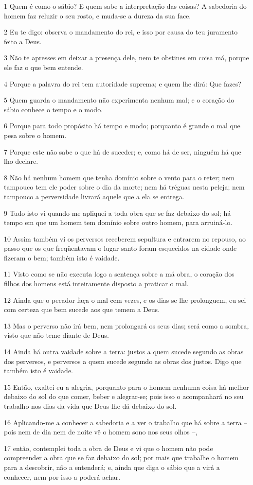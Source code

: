 \par 1 Quem é como o sábio? E quem sabe a interpretação das coisas? A sabedoria do homem faz reluzir o seu rosto, e muda-se a dureza da sua face.
\par 2 Eu te digo: observa o mandamento do rei, e isso por causa do teu juramento feito a Deus.
\par 3 Não te apresses em deixar a presença dele, nem te obstines em coisa má, porque ele faz o que bem entende.
\par 4 Porque a palavra do rei tem autoridade suprema; e quem lhe dirá: Que fazes?
\par 5 Quem guarda o mandamento não experimenta nenhum mal; e o coração do sábio conhece o tempo e o modo.
\par 6 Porque para todo propósito há tempo e modo; porquanto é grande o mal que pesa sobre o homem.
\par 7 Porque este não sabe o que há de suceder; e, como há de ser, ninguém há que lho declare.
\par 8 Não há nenhum homem que tenha domínio sobre o vento para o reter; nem tampouco tem ele poder sobre o dia da morte; nem há tréguas nesta peleja; nem tampouco a perversidade livrará aquele que a ela se entrega.
\par 9 Tudo isto vi quando me apliquei a toda obra que se faz debaixo do sol; há tempo em que um homem tem domínio sobre outro homem, para arruiná-lo.
\par 10 Assim também vi os perversos receberem sepultura e entrarem no repouso, ao passo que os que freqüentavam o lugar santo foram esquecidos na cidade onde fizeram o bem; também isto é vaidade.
\par 11 Visto como se não executa logo a sentença sobre a má obra, o coração dos filhos dos homens está inteiramente disposto a praticar o mal.
\par 12 Ainda que o pecador faça o mal cem vezes, e os dias se lhe prolonguem, eu sei com certeza que bem sucede aos que temem a Deus.
\par 13 Mas o perverso não irá bem, nem prolongará os seus dias; será como a sombra, visto que não teme diante de Deus.
\par 14 Ainda há outra vaidade sobre a terra: justos a quem sucede segundo as obras dos perversos, e perversos a quem sucede segundo as obras dos justos. Digo que também isto é vaidade.
\par 15 Então, exaltei eu a alegria, porquanto para o homem nenhuma coisa há melhor debaixo do sol do que comer, beber e alegrar-se; pois isso o acompanhará no seu trabalho nos dias da vida que Deus lhe dá debaixo do sol.
\par 16 Aplicando-me a conhecer a sabedoria e a ver o trabalho que há sobre a terra -- pois nem de dia nem de noite vê o homem sono nos seus olhos --,
\par 17 então, contemplei toda a obra de Deus e vi que o homem não pode compreender a obra que se faz debaixo do sol; por mais que trabalhe o homem para a descobrir, não a entenderá; e, ainda que diga o sábio que a virá a conhecer, nem por isso a poderá achar.


